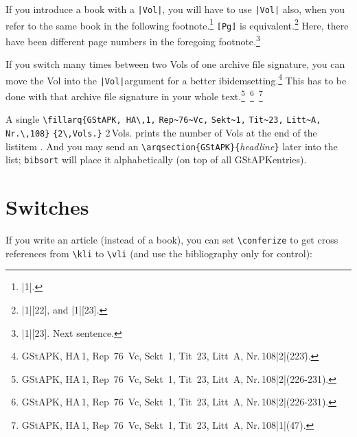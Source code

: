 \documentclass[12pt,a4paper]{article}
\renewcommand{\{}{{\normalfont\lbashortmem}}
\renewcommand{\}}{{\normalfont\rbashortmem}}
\let\mempage=\thepage
\renewcommand{\thepage}{\textit{\bapageframe{\roman{page}}}}
\begin{document}
  \noindent
  If you introduce a book with a \verb+|Vol|+, you will have to use
  \verb+|Vol|+ also, when you refer to the same book in the following
  footnote.\footnote{ |1|.}
  \verb+[Pg]+ is equivalent.\footnote{|1|[22], and |1|[23].}
  Here, there have been different page numbers in the foregoing
  footnote.\footnote{|1|[23]. Next sentence.}

  \vspace{1ex}\noindent
  If you switch many times between two Vols of one archive file signature,
  you can move the Vol into the \verb+|Vol|+\hy argument for a better
  ibidem\hy setting.\footnote{
  {GStAPK, HA\,1, Rep~76~Vc, Sekt~1, Tit~23, Litt~A, Nr.\,108}|2|(223\f).}
  This has to be done with that archive file signature in your whole
  text.\footnote{
  {GStAPK, HA\,1, Rep~76~Vc, Sekt~1, Tit~23,
  Litt~A, Nr.\,108}|2|(226-231).}\,%
  \footnote{
  {GStAPK, HA\,1, Rep~76~Vc, Sekt~1, Tit~23,
  Litt~A, Nr.\,108}|2|(226-231).}\,%
  \footnote{ 
  {GStAPK, HA\,1, Rep~76~Vc, Sekt~1, Tit~23, 
  Litt~A, Nr.\,108}|1|(47).}

\vspace{1ex}\noindent
A single \verb|\fillarq{GStAPK, HA\,1,| \verb|Rep~76~Vc,| \verb|Sekt~1,| 
\verb|Tit~23,| \verb|Litt~A,| \verb|Nr.\,108}| \verb|{2\,Vols.}| 
 {2\,Vols.}
prints the number of Vols at the end of the list\hy item . 
And you may send an \verb|\arqsection{GStAPK}{|\textit{headline}\verb|}| 
later into the list; \texttt{bibsort} will place it alphabetically 
(on top of all GStAPK\hy entries).


\newpage
\renewcommand{\thepage}{\mempage}
\setcounter{page}{1}
\setcounter{footnote}{0}
\section{Switches}
 If you write an article (instead of a book), you can set \verb|\conferize| 
 to get cross references from \verb|\kli| to \verb|\vli| (and use the 
 bibliography only for control):
\end{document}
